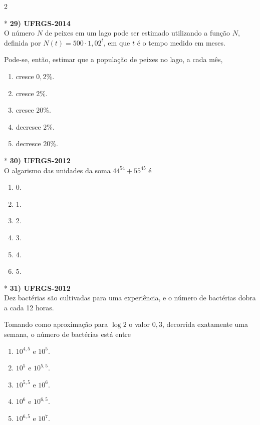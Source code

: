 \documentclass[11pt,a4paper]{article}
\begin{document}
\begin{paracol}{2}
\switchcolumn[1]
\vspace{6cm}

\switchcolumn[0]*
\textbf{29) UFRGS-2014} \\
O número $N$ de peixes em um lago pode ser estimado utilizando a função $N$, definida por $N(t) = 500 \cdot 1{,}02^t$, em que $t$ é o tempo medido em meses.

Pode-se, então, estimar que a população de peixes no lago, a cada mês,

\begin{enumerate}[label=(\Alph*)]
    \item cresce $0{,}2\%$.
    \item cresce $2\%$.
    \item cresce $20\%$.
    \item decresce $2\%$.
    \item decresce $20\%$.
\end{enumerate}
\vspace{0.4cm}

\switchcolumn[1]
\vspace{7cm}

\switchcolumn[0]*
\textbf{30) UFRGS-2012} \\
O algarismo das unidades da soma $44^{54} + 55^{45}$ é

\begin{enumerate}[label=(\Alph*)]
    \item 0.
    \item 1.
    \item 2.
    \item 3.
    \item 4.
    \item 5.
\end{enumerate}
\vspace{0.4cm}

\switchcolumn[1]
\vspace{6cm}

\switchcolumn[0]*
\textbf{31) UFRGS-2012} \\
Dez bactérias são cultivadas para uma experiência, e o número de bactérias dobra a cada 12 horas.

Tomando como aproximação para $\log 2$ o valor $0{,}3$, decorrida exatamente uma semana, o número de bactérias está entre

\begin{enumerate}[label=(\Alph*), itemsep=0.2cm]
    \item $10^{4{,}5} \text{ e } 10^5$.
    \item $10^5 \text{ e } 10^{5{,}5}$.
    \item $10^{5{,}5} \text{ e } 10^6$.
    \item $10^6 \text{ e } 10^{6{,}5}$.
    \item $10^{6{,}5} \text{ e } 10^7$.
\end{enumerate}
\vspace{0.4cm}


\end{paracol}
\end{document}
